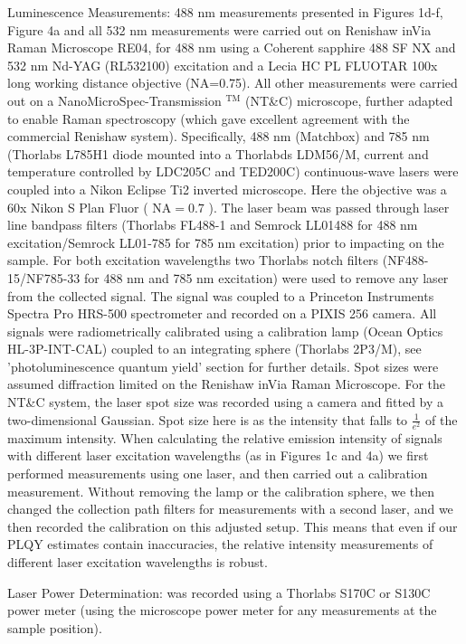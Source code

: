 \documentclass[10pt]{article}
\begin{document}
Luminescence Measurements: 488 nm measurements presented in Figures 1d-f, Figure 4a and all 532 nm measurements were carried out on Renishaw inVia Raman Microscope RE04, for 488 nm using a Coherent sapphire 488 SF NX and 532 nm Nd-YAG (RL532100) excitation and a Lecia HC PL FLUOTAR 100x long working distance objective (NA=0.75). All other measurements were carried out on a NanoMicroSpec-Transmission ${ }^{\mathrm{TM}}$ (NT\&C) microscope, further adapted to enable Raman spectroscopy (which gave excellent agreement with the commercial Renishaw system). Specifically, 488 nm (Matchbox) and 785 nm (Thorlabs L785H1 diode mounted into a Thorlabds LDM56/M, current and temperature controlled by LDC205C and TED200C) continuous-wave lasers were coupled into a Nikon Eclipse Ti2 inverted microscope. Here the objective was a 60x Nikon S Plan Fluor ( $\mathrm{NA}=0.7$ ). The laser beam was passed through laser line bandpass filters (Thorlabs FL488-1 and Semrock LL01488 for 488 nm excitation/Semrock LL01-785 for 785 nm excitation) prior to impacting on the sample. For both excitation wavelengths two Thorlabs notch filters (NF488-15/NF785-33 for 488 nm and 785 nm excitation) were used to remove any laser from the collected signal. The signal was coupled to a Princeton Instruments Spectra Pro HRS-500 spectrometer and recorded on a PIXIS 256 camera. All signals were radiometrically calibrated using a calibration lamp (Ocean Optics HL-3P-INT-CAL) coupled to an integrating sphere (Thorlabs 2P3/M), see 'photoluminescence quantum yield' section for further details. Spot sizes were assumed diffraction limited on the Renishaw inVia Raman Microscope. For the NT\&C system, the laser spot size was recorded using a camera and fitted by a two-dimensional Gaussian. Spot size here is as the intensity that falls to $\frac{1}{e^{2}}$ of the maximum intensity. When calculating the relative emission intensity of signals with different laser excitation wavelengths (as in Figures 1c and 4a) we first performed measurements using one laser, and then carried out a calibration measurement. Without removing the lamp or the calibration sphere, we then changed the collection path filters for measurements with a second laser, and we then recorded the calibration on this adjusted setup. This means that even if our PLQY estimates contain inaccuracies, the relative intensity measurements of different laser excitation wavelengths is robust.

Laser Power Determination: was recorded using a Thorlabs S170C or S130C power meter (using the microscope power meter for any measurements at the sample position).
\end{document}

